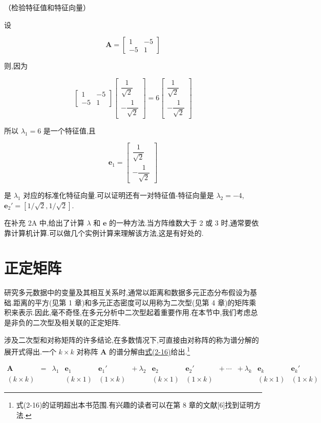  （检验特征值和特征向量）

设

\[
\bm{A} = \begin{bmatrix} 1 & -5 \\ -5 & 1 \end{bmatrix}
\]

则,因为

\[
\begin{bmatrix} 1 & -5 \\ -5 & 1 \end{bmatrix}\begin{bmatrix} \dfrac{1}{\sqrt{2}} \\[2mm] -\dfrac{1}{\sqrt{2}} \end{bmatrix} = 6\begin{bmatrix} \dfrac{1}{\sqrt{2}} \\[2mm] -\dfrac{1}{\sqrt{2}} \end{bmatrix}
\]

所以 $\lambda_1 = 6$ 是一个特征值,且

\[
\bm{e}_1 = \begin{bmatrix} \dfrac{1}{\sqrt{2}} \\[2mm] -\dfrac{1}{\sqrt{2}} \end{bmatrix}
\]

是 $\lambda_1$ 对应的标准化特征向量.可以证明还有一对特征值-特征向量是 $\lambda_2 = -4$, $\bm{e}_2' = [1/\sqrt{2}, 1/\sqrt{2}]$.

在补充 2A 中,给出了计算 $\lambda$ 和 $\bm{e}$ 的一种方法.当方阵维数大于 2 或 3 时,通常要依靠计算机计算.可以做几个实例计算来理解该方法,这是有好处的.

\section{正定矩阵}  %
\label{sec:2.3}

研究多元数据中的变量及其相互关系时,通常以距离和数据多元正态分布假设为基础.距离的平方(见第 1 章)和多元正态密度可以用称为二次型(见第 4 章)的矩阵乘积来表示.因此,毫不奇怪,在多元分析中二次型起着重要作用.在本节中,我们考虑总是非负的二次型及相关联的正定矩阵.

涉及二次型和对称矩阵的许多结论,在多数情况下,可直接由对称阵的称为谱分解的展开式得出.一个 $k \times k$ 对称阵 $\bm{A}$ 的谱分解由\hyperref[eq:2-16]{式(2-16)}给出.\footnote{式(2-16)的证明超出本书范围.有兴趣的读者可以在第 8 章的文献[6]找到证明方法.}

\label{eq:2-16}
\begin{equation}
\begin{array}{llclclclclcl}
\bm{A} & = & \lambda_1 & \bm{e}_1 & \bm{e}_1' & +\ \lambda_2 & \bm{e}_2 & \bm{e}_2' & +\ \cdots & +\ \lambda_k & \bm{e}_k & \bm{e}_k' \\
(k \times k) & & & (k \times 1) & (1 \times k) & & (k \times 1) & (1 \times k) & & & (k \times 1) & (1 \times k)
\end{array} \tag{2-16}
\end{equation}

